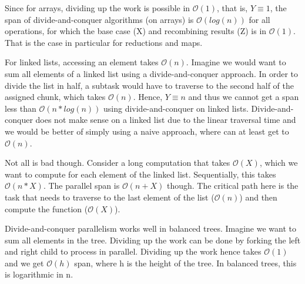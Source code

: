 \documentclass[main.tex]{subfiles}
\begin{document}
Since for arrays, dividing up the work is possible in \(\mathcal{O}(1)\), that is, \(Y\equiv 1\), the span of divide-and-conquer algorithms (on arrays) is \(\mathcal{O}(log(n))\) for all operations, for which the base case (X) and recombining results (Z) is in \(\mathcal{O}(1)\). That is the case in particular for reductions and maps.

For linked lists, accessing an element takes \(\mathcal{O}(n)\). Imagine we would want to sum all elements of a linked list using a divide-and-conquer approach. In order to divide the list in half, a subtask would have to traverse to the second half of the assigned chunk, which takes \(\mathcal{O}(n)\). Hence, \(Y\equiv n\) and thus we cannot get a span less than \(\mathcal{O}(n*log(n))\) using divide-and-conquer on linked lists. Divide-and-conquer does not make sense on a linked list due to the linear traversal time and we would be better of simply using a naive approach, where can at least get to \(\mathcal{O}(n)\).

Not all is bad though. Consider a long computation that takes \(\mathcal{O}(X)\), which we want to compute for each element of the linked list. Sequentially, this takes \(\mathcal{O}(n*X)\). The parallel span is \(\mathcal{O}(n + X)\) though. The critical path here is the task that needs to traverse to the last element of the list (\(\mathcal{O}(n)\)) and then compute the function (\(\mathcal{O}(X)\)).

Divide-and-conquer parallelism works well in balanced trees. Imagine we want to sum all elements in the tree. Dividing up the work can be done by forking the left and right child to process in parallel. Dividing up the work hence takes \(\mathcal{O}(1)\) and we get \(\mathcal{O}(h)\) span, where h is the height of the tree. In balanced trees, this is logarithmic in n.
\end{document}

